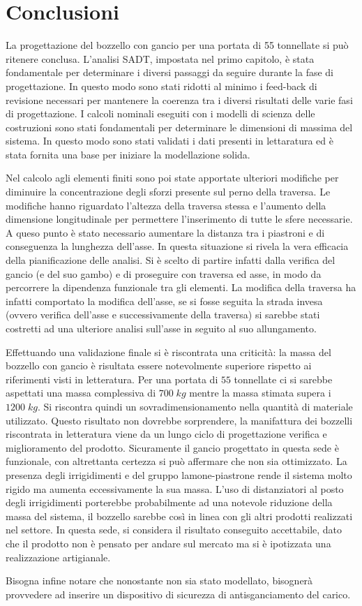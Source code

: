 \section{Conclusioni}
La progettazione del bozzello con gancio per una portata di 55 tonnellate si può ritenere conclusa. 
L'analisi SADT, impostata nel primo capitolo, è stata fondamentale per determinare i diversi passaggi da seguire durante la fase di progettazione. 
In questo modo sono stati ridotti al minimo i feed-back di revisione necessari per mantenere la coerenza tra i diversi risultati delle varie fasi di progettazione. 
I calcoli nominali eseguiti con i modelli di scienza delle costruzioni sono stati fondamentali per determinare le dimensioni di massima del sistema. 
In questo modo sono stati validati i dati presenti in lettaratura ed è stata fornita una base per iniziare la modellazione solida.

Nel calcolo agli elementi finiti sono poi state apportate ulteriori modifiche per diminuire la concentrazione degli sforzi presente sul perno della traversa.
Le modifiche hanno riguardato l'altezza della traversa stessa e l'aumento della dimensione longitudinale per permettere l'inserimento di tutte le sfere necessarie. 
A queso punto è stato necessario aumentare la distanza tra i piastroni e di conseguenza la lunghezza dell'asse. 
In questa situazione si rivela la vera efficacia della pianificazione delle analisi.
Si è scelto di partire infatti dalla verifica del gancio (e del suo gambo) e di proseguire con traversa ed asse, in modo da percorrere la dipendenza funzionale tra gli elementi. 
La modifica della traversa ha infatti comportato la modifica dell'asse, se si fosse seguita la strada invesa (ovvero verifica dell'asse e successivamente della traversa) si sarebbe stati costretti ad una ulteriore analisi sull'asse in seguito al suo allungamento. 

Effettuando una validazione finale si è riscontrata una criticità: la massa del bozzello con gancio è risultata essere notevolmente superiore rispetto ai riferimenti visti in letteratura.
Per una portata di $55$ tonnellate ci si sarebbe aspettati una massa complessiva di $700 \; kg$ mentre la massa stimata supera i $1200 \; kg$.
Si riscontra quindi un sovradimensionamento nella quantità di materiale utilizzato. 
Questo risultato non dovrebbe sorprendere, la manifattura dei bozzelli riscontrata in letteratura viene da un lungo ciclo di progettazione verifica e miglioramento del prodotto. 
Sicuramente il gancio progettato in questa sede è funzionale, con altrettanta certezza si può affermare che non sia ottimizzato. 
La presenza degli irrigidimenti e del gruppo lamone-piastrone rende il sistema molto rigido ma aumenta eccessivamente la sua massa. 
L'uso di distanziatori al posto degli irrigidimenti porterebbe probabilmente ad una notevole riduzione della massa del sistema, il bozzello sarebbe così in linea con gli altri prodotti realizzati nel settore. 
In questa sede, si considera il risultato conseguito accettabile, dato che il prodotto non è pensato per andare sul mercato ma si è ipotizzata una realizzazione artigianale.

Bisogna infine notare che nonostante non sia stato modellato, bisognerà provvedere ad inserire un dispositivo di sicurezza di antisganciamento del carico. 



